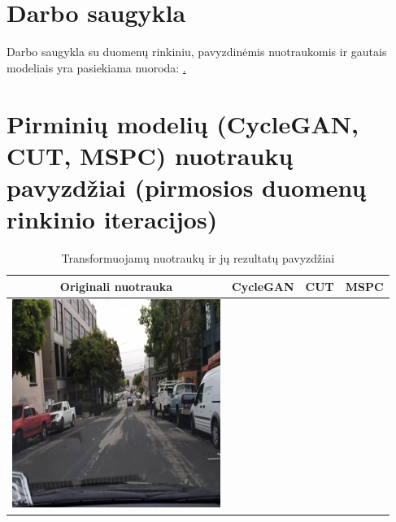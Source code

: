 \documentclass{VUMIFPSbakalaurinis}
\begin{document}
    

\printbibliography[heading=bibintoc]

\appendix

\section{Darbo saugykla}
    Darbo saugykla su duomenų rinkiniu, pavyzdinėmis nuotraukomis ir gautais modeliais yra pasiekiama nuoroda: \href{https://github.com/0ksas/bachelors}.


\section{Pirminių modelių (CycleGAN, CUT, MSPC) nuotraukų pavyzdžiai (pirmosios duomenų rinkinio iteracijos)}
    \begin{table}[H]
        \footnotesize
        \centering
        \caption{Transformuojamų nuotraukų ir jų rezultatų pavyzdžiai}
        {\begin{tabular}{|c|c|c|c|} \hline
            Originali nuotrauka & CycleGAN  & CUT  & MSPC\\
            \hline
            \includegraphics[scale=0.35]{img/pvz/1_real} & 

\end{tabular}}
\end{table}
\end{document}
